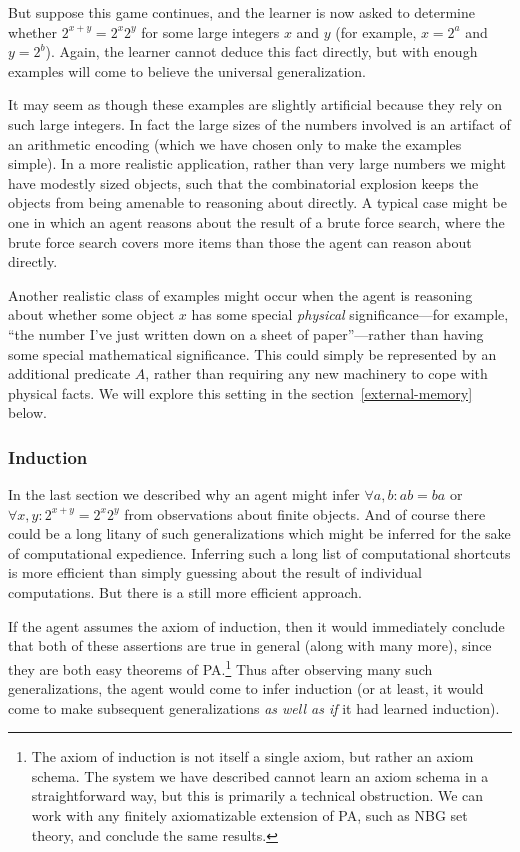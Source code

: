 \documentclass[12pt]{article}
\theoremstyle{definition}
\begin{document}
But suppose this game continues,
and the learner is now asked to determine whether $2^{x+y} = 2^x 2^y$
for some large integers $x$ and $y$ (for example, $x = 2^a$ and $y = 2^b$).
Again, the learner cannot deduce this fact directly, but with enough examples
will come to believe the universal generalization.

It may seem as though these examples are slightly artificial because they rely on such large
integers.
In fact the large sizes of the numbers involved is an artifact of an arithmetic encoding
(which we have chosen only to make the examples simple).
In a more realistic application, rather than very large numbers
we might have modestly sized objects, such that the combinatorial
explosion keeps the objects from being amenable to reasoning about directly.
A typical case might be one in which an agent reasons about the result
of a brute force search, where the brute force
search covers more items than those the agent can reason about directly.

Another realistic class of examples might occur when the agent
is reasoning about whether some object $x$ has some special \emph{physical}
significance---for example, ``the number I've just written down on a sheet of paper''---rather
than having some special mathematical significance.
This could simply be represented by an additional predicate $A$, rather than requiring
any new machinery to cope with physical facts.
We will explore this setting in the section~\ref{external-memory} below.

\subsubsection{Induction}

In the last section we described why an agent might
infer $\forall a, b: ab = ba$
or $\forall x, y : 2^{x+y} = 2^x 2^y$ from observations
about finite objects.
And of course there could be a long litany
of such generalizations
which might be inferred for the sake of computational expedience.
Inferring such a long list of computational shortcuts
is more efficient than simply guessing about the result of individual computations.
But there is a still more efficient approach.

If the agent assumes the axiom of induction, then it would immediately conclude
that both of these assertions are true in general (along with many more),
since they are both easy theorems of PA.\footnote{The
axiom of induction is not itself a single axiom, but rather an axiom schema.
The system we have described cannot learn an axiom schema in a straightforward way,
but this is primarily a technical obstruction.
We can work with any finitely axiomatizable extension of PA,
such as NBG set theory, and conclude the same results.}
Thus after observing many such generalizations,
the agent would come to infer induction (or at least,
it would come to make subsequent generalizations \emph{as well as if}
it had learned induction).
\end{document}
